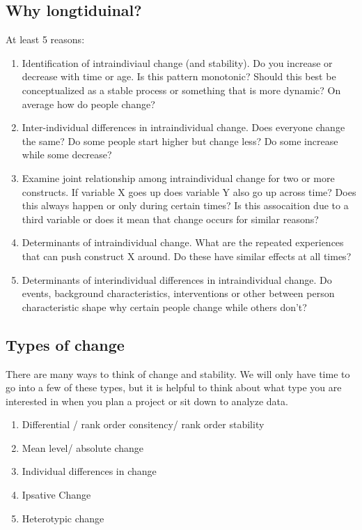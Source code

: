 \documentclass[]{book}
\begin{document}
\subsection{Why longtiduinal?}\label{why-longtiduinal}

At least 5 reasons:

\begin{enumerate}
\def\labelenumi{\arabic{enumi}.}
\item
  Identification of intraindiviaul change (and stability). Do you
  increase or decrease with time or age. Is this pattern monotonic?
  Should this best be conceptualized as a stable process or something
  that is more dynamic? On average how do people change?
\item
  Inter-individual differences in intraindividual change. Does everyone
  change the same? Do some people start higher but change less? Do some
  increase while some decrease?
\item
  Examine joint relationship among intraindividual change for two or
  more constructs. If variable X goes up does variable Y also go up
  across time? Does this always happen or only during certain times? Is
  this assocaition due to a third variable or does it mean that change
  occurs for similar reasons?
\item
  Determinants of intraindividual change. What are the repeated
  experiences that can push construct X around. Do these have similar
  effects at all times?
\item
  Determinants of interindividual differences in intraindividual change.
  Do events, background characteristics, interventions or other between
  person characteristic shape why certain people change while others
  don't?
\end{enumerate}

\subsection{Types of change}\label{types-of-change}

There are many ways to think of change and stability. We will only have
time to go into a few of these types, but it is helpful to think about
what type you are interested in when you plan a project or sit down to
analyze data.

\begin{enumerate}
\def\labelenumi{\arabic{enumi}.}
\item
  Differential / rank order consitency/ rank order stability
\item
  Mean level/ absolute change
\item
  Individual differences in change
\item
  Ipsative Change
\item
  Heterotypic change
\end{enumerate}
\end{document}
